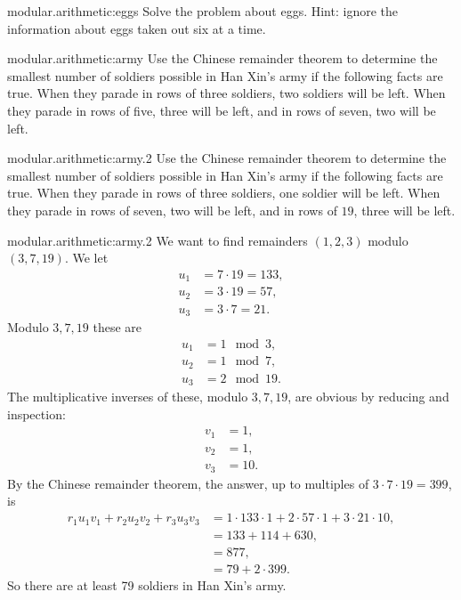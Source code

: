 \begin{problem}{modular.arithmetic:eggs}
Solve the problem about eggs. Hint: ignore the information about eggs taken out six at a time.
\end{problem}
\begin{problem}{modular.arithmetic:army}
Use the Chinese remainder theorem to determine the smallest number of soldiers possible in Han Xin's army if the following facts are true.
When they parade in rows of three soldiers, two soldiers will be left. When they parade in rows of five, three will be left, and in rows of seven, two will be left.
\end{problem}
\begin{problem}{modular.arithmetic:army.2}
Use the Chinese remainder theorem to determine the smallest number of soldiers possible in Han Xin's army if the following facts are true.
When they parade in rows of three soldiers, one soldier will be left. When they parade in rows of seven, two will be left, and in rows of \(19\), three will be left.
\end{problem}
\begin{answer}{modular.arithmetic:army.2}
We want to find remainders \((1,2,3)\) modulo \((3,7,19)\).
We let 
\begin{align*}
u_1 &= 7 \cdot 19 = 133, \\
u_2 &= 3 \cdot 19 = 57, \\
u_3 &= 3 \cdot 7 = 21.
\end{align*}
Modulo \(3,7,19\) these are
\begin{align*}
u_1 &= 1 \mod{3}, \\
u_2 &= 1 \mod{7}, \\
u_3 &= 2 \mod{19}.
\end{align*}
The multiplicative inverses of these, modulo \(3,7,19\), are obvious by reducing and inspection:
\begin{align*}
v_1 &= 1, \\
v_2 &= 1, \\
v_3 &= 10.
\end{align*}
By the Chinese remainder theorem, the answer, up to multiples of \(3 \cdot 7 \cdot 19=399\), is
\begin{align*}
r_1 u_1 v_1 + r_2 u_2 v_2 + r_3 u_3 v_3 
&=
1 \cdot 133 \cdot 1 
+
2 \cdot 57 \cdot 1
+
3 \cdot 21 \cdot 10,
\\
&=
133+114+630,
\\
&=877,
\\
&=79+2 \cdot 399.
\end{align*}
So there are at least 79 soldiers in Han Xin's army.
\end{answer}
